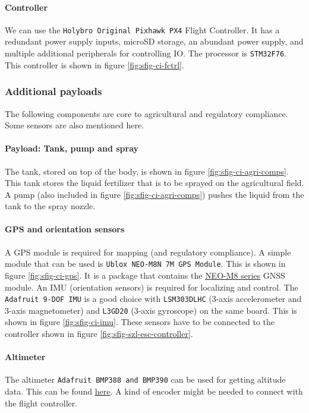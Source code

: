 \paragraph*{Controller}
We can use the \texttt{Holybro Original Pixhawk PX4} Flight Controller. It has a redundant power supply inputs, microSD storage, an abundant power supply, and multiple additional peripherals for controlling IO. The processor is \texttt{STM32F76}. This controller is shown in figure \ref{fig:sfig-ci-fctrl}.

\subsubsection*{Additional payloads}

The following components are core to agricultural and regulatory compliance. Some sensors are also mentioned here.

\paragraph*{Payload: Tank, pump and spray}
The tank, stored on top of the body, is shown in figure \ref{fig:sfig-ci-agri-comps}. This tank stores the liquid fertilizer that is to be sprayed on the agricultural field. A pump (also included in figure \ref{fig:sfig-ci-agri-comps}) pushes the liquid from the tank to the spray nozzle.

\paragraph*{GPS and orientation sensors}
A GPS module is required for mapping (and regulatory compliance). A simple module that can be used is \texttt{Ublox NEO-M8N 7M GPS Module}. This is shown in figure \ref{fig:sfig-ci-gps}. It is a package that contains the \href{https://www.u-blox.com/en/product/neo-m8-series}{NEO-M8 series} GNSS module. An IMU (orientation sensors) is required for localizing and control. The \texttt{Adafruit 9-DOF IMU} is a good choice with \texttt{LSM303DLHC} (3-axis accelerometer and 3-axis magnetometer) and \texttt{L3GD20} (3-axis gyroscope) on the same board. This is shown in figure \ref{fig:sfig-ci-imu}. These sensors have to be connected to the controller shown in figure \ref{fig:sfig-szl-esc-controller}.

\paragraph*{Altimeter}
The altimeter \texttt{Adafruit BMP388 and BMP390} can be used for getting altitude data. This can be found \href{https://learn.adafruit.com/adafruit-bmp388-bmp390-bmp3xx/arduino}{here}. A kind of encoder might be needed to connect with the flight controller.

